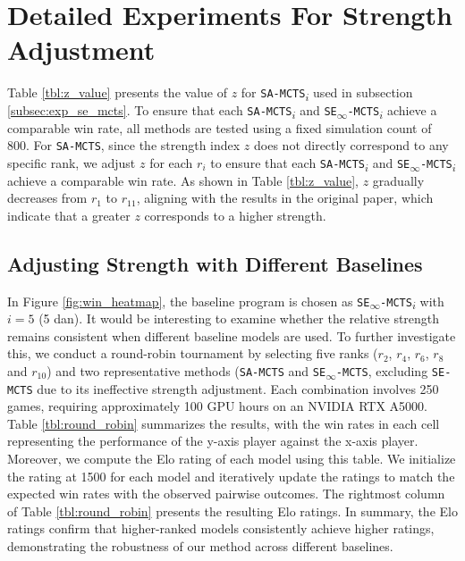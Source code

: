 \clearpage
\section{Detailed Experiments For Strength Adjustment}\label{app:detailed_exp}


Table \ref{tbl:z_value} presents the value of $z$ for \texttt{SA-MCTS\textsubscript{$i$}} used in subsection \ref{subsec:exp_se_mcts}.
To ensure that each \texttt{SA-MCTS\textsubscript{$i$}} and \texttt{SE\textsubscript{$\infty$}-MCTS\textsubscript{$i$}} achieve a comparable win rate, all methods are tested using a fixed simulation count of 800.
For \texttt{SA-MCTS}, since the strength index $z$ does not directly correspond to any specific rank, we adjust $z$ for each $r_i$ to ensure that each \texttt{SA-MCTS\textsubscript{$i$}} and \texttt{SE\textsubscript{$\infty$}-MCTS\textsubscript{$i$}} achieve a comparable win rate.
As shown in Table \ref{tbl:z_value}, $z$ gradually decreases from $r_1$ to $r_{11}$, aligning with the results in the original paper, which indicate that a greater $z$ corresponds to a higher strength.



\subsection{Adjusting Strength with Different Baselines}\label{app:round_robin}
In Figure \ref{fig:win_heatmap}, the baseline program is chosen as \texttt{SE\textsubscript{$\infty$}-MCTS\textsubscript{$i$}} with $i=5$ (5 dan).
It would be interesting to examine whether the relative strength remains consistent when different baseline models are used.
To further investigate this, we conduct a round-robin tournament by selecting five ranks ($r_2$, $r_4$, $r_6$, $r_8$ and $r_{10}$) and two representative methods (\texttt{SA-MCTS} and \texttt{SE\textsubscript{$\infty$}-MCTS}, excluding \texttt{SE-MCTS} due to its ineffective strength adjustment.
Each combination involves 250 games, requiring approximately 100 GPU hours on an NVIDIA RTX A5000.
Table \ref{tbl:round_robin} summarizes the results, with the win rates in each cell representing the performance of the y-axis player against the x-axis player.
Moreover, we compute the Elo rating of each model using this table.
We initialize the rating at 1500 for each model and iteratively update the ratings to match the expected win rates with the observed pairwise outcomes.
The rightmost column of Table \ref{tbl:round_robin} presents the resulting Elo ratings.
In summary, the Elo ratings confirm that higher-ranked models consistently achieve higher ratings, demonstrating the robustness of our method across different baselines.




